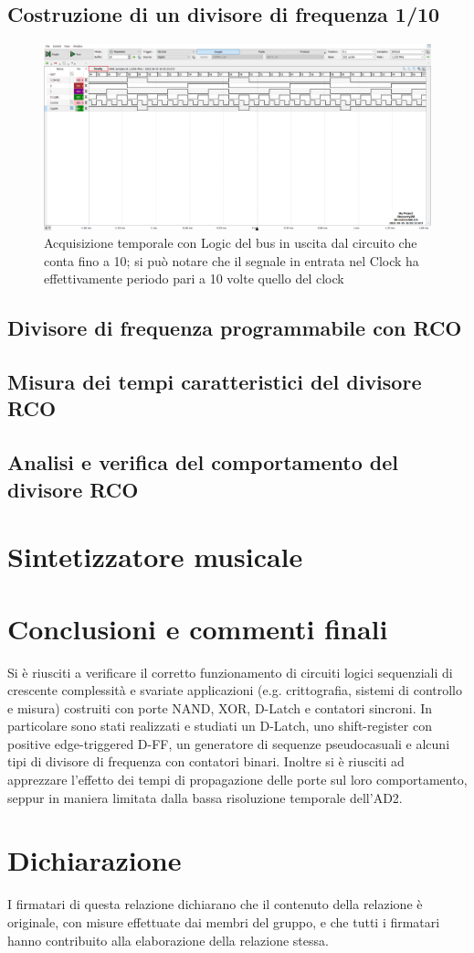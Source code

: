 \documentclass[10pt, a4paper, italian]{article}
\begin{document}
\subsection{Costruzione di un divisore di frequenza 1/10}
\begin{figure}[htbp]
\centering
	\includegraphics[width=\textwidth]{5.e}
	\caption{Acquisizione temporale con Logic del bus in uscita dal circuito che conta fino a 10; si può notare che il segnale in entrata nel Clock ha effettivamente periodo pari a 10 volte quello del clock \label{fig: Count_10th}}
\end{figure}

\subsection{Divisore di frequenza programmabile con RCO}
\subsection{Misura dei tempi caratteristici del divisore RCO}
\subsection{Analisi e verifica del comportamento del divisore RCO}

\section{Sintetizzatore musicale}

\section*{Conclusioni e commenti finali}
Si è riusciti a verificare il corretto funzionamento di circuiti logici
sequenziali di crescente complessità e svariate applicazioni (e.g.
crittografia, sistemi di controllo e misura) costruiti con porte NAND, XOR,
D-Latch e contatori sincroni.
In particolare sono stati realizzati e studiati un D-Latch, uno shift-register
con positive edge-triggered D-FF, un generatore di sequenze pseudocasuali e
alcuni tipi di divisore di frequenza con contatori binari.
Inoltre si è riusciti ad apprezzare l'effetto dei tempi di propagazione
delle porte sul loro comportamento, seppur in maniera limitata dalla bassa
risoluzione temporale dell'AD2.

\section*{Dichiarazione}
I firmatari di questa relazione dichiarano che il contenuto della relazione \`e
originale, con misure effettuate dai membri del gruppo, e che tutti i firmatari
hanno contribuito alla elaborazione della relazione stessa.
\end{document}

